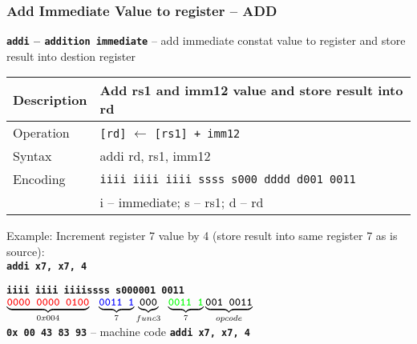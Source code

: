 \documentclass{beamer}
\begin{document}
\begin{frame}
\frametitle{Add Immediate Value to register -- ADD}

\textbf{\texttt{addi} -- \texttt{addition immediate}} -- add immediate constat value to register and store result into destion register

\bigskip

\begin{tabular}{|l|l|}\hline
Description & Add rs1 and imm12 value and store result into rd \\ \hline
Operation& \texttt{[rd]} $\leftarrow$ \texttt{[rs1] + imm12} \\ \hline
Syntax & addi rd, rs1, imm12 \\ \hline
Encoding & \texttt{iiii iiii iiii ssss s000 dddd d001 0011} \\
 & i -- immediate; s -- rs1; d -- rd \\ \hline
\end{tabular}

\bigskip

Example: Increment register 7 value by 4 (store result into same register 7 as is source):\\
\textbf{\texttt{addi x7, x7, 4}}

\textbf{\texttt{\color{red}iiii iiii iiii}}\phantom{xx}\textbf{\texttt{\color{blue}ssss s}}\hspace{0.1cm}\textbf{\texttt{000\hspace{0.05cm}001 0011}}\\
$\underbrace{\textbf{\texttt{\color{red}0000 0000 0100}}}_{0x004}\texttt{ }\underbrace{\textbf{\texttt{\color{blue}0011 1}}}_{7}\underbrace{\textbf{\texttt{000}}}_{func3}\phantom{i}\underbrace{\textbf{\texttt{\color{green}0011 1}}}_{7}\underbrace{\textbf{\texttt{001 0011}}}_{opcode}$\\

\textbf{\texttt{0x 00 43 83 93}} -- machine code \textbf{\texttt{addi x7, x7, 4}}


\end{frame}
\end{document}
